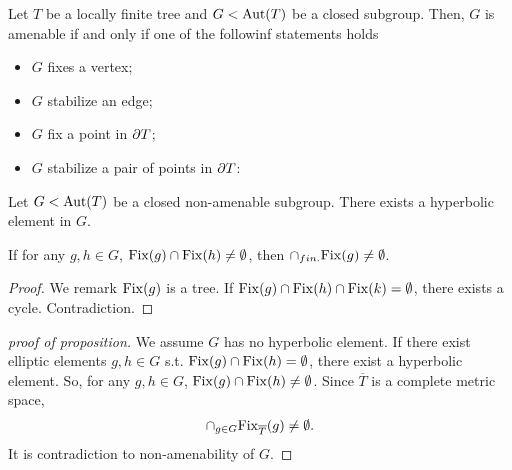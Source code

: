 \begin{theorem}
  Let $T$ be a locally finite tree and $G < {\rm Aut}(T)$ be a closed subgroup.
  Then, $G$ is amenable if and only if one of the followinf statements holds
  \begin{itemize}
  \item $G$ fixes a vertex;
  \item $G$ stabilize an edge;
  \item $G$ fix a point in $\frak{\partial} T$;
  \item $G$ stabilize a pair of points in $\frak{\partial} T$:
  \end{itemize}
\end{theorem}

\begin{proposition}
  Let $G < {\rm Aut}(T)$ be a closed non-amenable subgroup.
  There exists a hyperbolic element in $G$.
\end{proposition}

\begin{lemma}
  If for any $g,h \in G$, ${\rm Fix}(g) \cap {\rm Fix}(h) \neq \emptyset$,
  then $\cap_{fin.}{\rm Fix}(g) \neq \emptyset$.
\end{lemma}

\begin{proof}
  We remark ${\rm Fix}(g)$ is a tree.
  If ${\rm Fix}(g) \cap {\rm Fix}(h) \cap {\rm Fix}(k) = \emptyset$,
  there exists a cycle.
  Contradiction.
\end{proof}

\begin{proof}[proof of proposition]
  We assume $G$ has no hyperbolic element. 
  If there exist elliptic elements $g,h \in G$ s.t. ${\rm Fix}(g) \cap {\rm Fix}(h) = \emptyset$, there exist a hyperbolic element.
  So, for any $g,h \in G$, ${\rm Fix}(g) \cap {\rm Fix}(h) \neq \emptyset$.
  Since $\overline{T}$ is a complete metric space,
  \begin{align*}
    \cap_{g \in G} {\rm Fix}_{\overline{T}}(g) \neq \emptyset.
  \end{align*}
  It is contradiction to non-amenability of $G$.
\end{proof}
